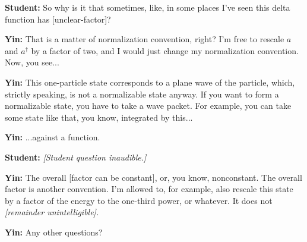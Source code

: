 \noindent\textbf{Student:} So why is it that sometimes, like, in some places I've seen this delta function has [unclear-factor]?\par
\noindent\textbf{Yin:} That is a matter of normalization convention, right? I'm free to rescale $a$ and $a^\dagger$ by a factor of two, and I would just change my normalization convention. Now, you see...\par

\noindent\textbf{Yin:} This one-particle state corresponds to a plane wave of the particle, which, strictly speaking, is not a normalizable state anyway. If you want to form a normalizable state, you have to take a wave packet. For example, you can take some state like that, you know, integrated by this...\par

\noindent\textbf{Yin:} ...against a function.\par
\noindent\textbf{Student:} \textit{[Student question inaudible.]}\par
\noindent\textbf{Yin:} The overall [factor can be constant], or, you know, nonconstant. The overall factor is another convention. I'm allowed to, for example, also rescale this state by a factor of the energy to the one-third power, or whatever. It does not \textit{[remainder unintelligible].}\par

\noindent\textbf{Yin:} Any other questions?\par

